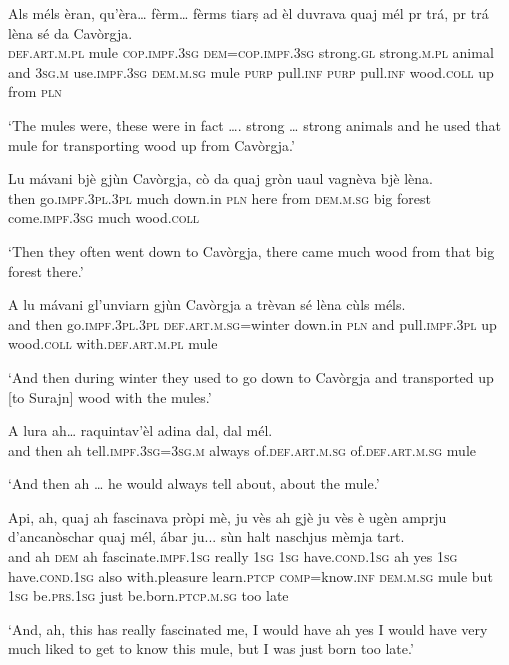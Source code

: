\begin{linenumbers}
\gll Als méls èran, qu’èra… fèrm… fèrms tiarṣ ad èl duvrava quaj mél pr trá, pr trá lèna sé da Cavòrgja.   \\
 \textsc{def.art.m.pl} mule \textsc{cop.impf.3sg} \textsc{dem=cop.impf.3sg}  strong.\textsc{gl}  strong.\textsc{m.pl} animal and \textsc{3sg.m} use.\textsc{impf.3sg} \textsc{dem.m.sg} mule  \textsc{purp} pull.\textsc{inf} \textsc{purp} pull.\textsc{inf}  wood.\textsc{coll} up from \textsc{pln}  \\
\end{linenumbers}
\medskip
\glt `The mules were, these were in fact …. strong … strong animals and he used that mule for transporting wood up from Cavòrgja.'
\medskip

\begin{linenumbers}
\gll  Lu mávani bjè gjùn Cavòrgja, cò da quaj gròn uaul vagnèva bjè lèna.  \\
then go.\textsc{impf.3pl.3pl} much down.in \textsc{pln} here from \textsc{dem.m.sg} big forest come.\textsc{impf.3sg} much wood.\textsc{coll}  \\
\end{linenumbers}
\medskip
\glt `Then they often went down to Cavòrgja, there came much wood from that big forest there.'
\medskip

\begin{linenumbers}
\gll  A lu mávani gl'unviarn gjùn Cavòrgja a trèvan sé lèna cùls méls.  \\
and then go.\textsc{impf.3pl.3pl} \textsc{def.art.m.sg}=winter down.in \textsc{pln} and pull.\textsc{impf.3pl} up  wood.\textsc{coll} with.\textsc{def.art.m.pl} mule \\
\end{linenumbers}
\medskip
\glt `And then during winter they used to go down to Cavòrgja and transported up [to Surajn] wood with the mules.'
\medskip

\begin{linenumbers}
\gll  A lura ah… raquintav’èl adina dal, dal mél.  \\
and then ah tell.\textsc{impf.3sg=3sg.m} always of.\textsc{def.art.m.sg} of.\textsc{def.art.m.sg} mule\\
\end{linenumbers}
\medskip
\glt `And  then ah … he would always tell about, about the mule.'
\medskip

\begin{linenumbers}
\gll  Api, ah, quaj ah fascinava pròpi mè, ju vès ah gjè ju vès è ugèn amprju d’ancanòschar quaj mél, ábar ju... sùn halt naschjus mèmja tart. \\
and ah \textsc{dem} ah fascinate.\textsc{impf.1sg} really \textsc{1sg}  \textsc{1sg} have.\textsc{cond.1sg} ah yes \textsc{1sg} have.\textsc{cond.1sg} also with.pleasure  learn.\textsc{ptcp} \textsc{comp}=know.\textsc{inf} \textsc{dem.m.sg} mule but  \textsc{1sg} be.\textsc{prs.1sg} just be.born.\textsc{ptcp.m.sg} too late\\
\end{linenumbers}
\medskip
\glt `And, ah, this has really fascinated me, I would have ah yes I would have very much liked to get to know this mule, but I was just born too late.'
\medskip


